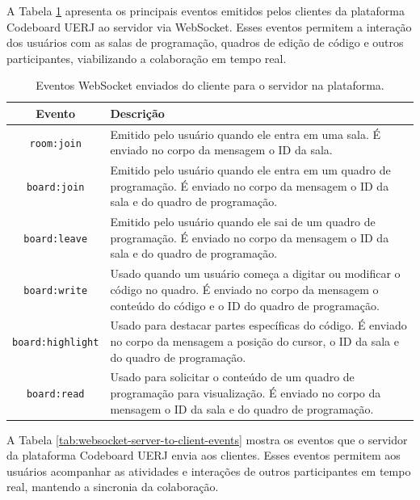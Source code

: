 A Tabela \ref{tab:websocket-client-to-server-events} apresenta os principais eventos emitidos pelos clientes da plataforma Codeboard UERJ ao servidor via WebSocket. Esses eventos permitem a interação dos usuários com as salas de programação, quadros de edição de código e outros participantes, viabilizando a colaboração em tempo real.

\begin{table}[H]
    \centering
    \renewcommand{\arraystretch}{1.3} 
    \begin{tabular}{|c|p{10cm}|}
        \hline
        \textbf{Evento} & \textbf{Descrição} \\
        \hline
        \texttt{room:join} & Emitido pelo usuário quando ele entra em uma sala. É enviado no corpo da mensagem o ID da sala. \\
        \hline
        \texttt{board:join} & Emitido pelo usuário quando ele entra em um quadro de programação. É enviado no corpo da mensagem o ID da sala e do quadro de programação. \\
        \hline
        \texttt{board:leave} & Emitido pelo usuário quando ele sai de um quadro de programação. É enviado no corpo da mensagem o ID da sala e do quadro de programação. \\
        \hline
        \texttt{board:write} & Usado quando um usuário começa a digitar ou modificar o código no quadro. É enviado no corpo da mensagem o conteúdo do código e o ID do quadro de programação. \\
        \hline
        \texttt{board:highlight} & Usado para destacar partes específicas do código. É enviado no corpo da mensagem a posição do cursor, o ID da sala e do quadro de programação. \\
        \hline
        \texttt{board:read} & Usado para solicitar o conteúdo de um quadro de programação para visualização. É enviado no corpo da mensagem o ID da sala e do quadro de programação. \\
        \hline
    \end{tabular}
    \caption{Eventos WebSocket enviados do cliente para o servidor na plataforma.}
    \label{tab:websocket-client-to-server-events}
\end{table}


A Tabela \ref{tab:websocket-server-to-client-events} mostra os eventos que o servidor da plataforma Codeboard UERJ envia aos clientes. Esses eventos permitem aos usuários acompanhar as atividades e interações de outros participantes em tempo real, mantendo a sincronia da colaboração.



